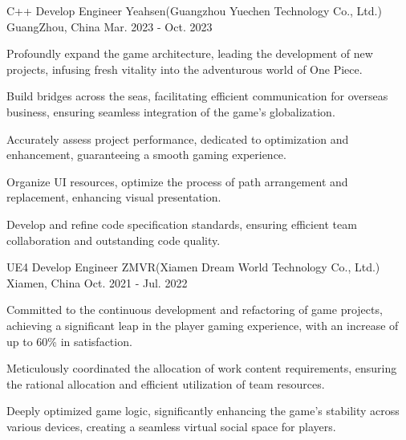

\begin{cventries}

  \cventry
    {C++ Develop Engineer} %
    {Yeahsen(Guangzhou Yuechen Technology Co., Ltd.)} %
    {GuangZhou, China} %
    {Mar. 2023 - Oct. 2023} %
    {
      \begin{cvitems} %
        \item {Profoundly expand the game architecture, leading the development of new projects, infusing fresh vitality into the adventurous world of One Piece.} 
        \item {Build bridges across the seas, facilitating efficient communication for overseas business, ensuring seamless integration of the game’s globalization.} 
        \item {Accurately assess project performance, dedicated to optimization and enhancement, guaranteeing a smooth gaming experience.} 
        \item {Organize UI resources, optimize the process of path arrangement and replacement, enhancing visual presentation.} 
        \item {Develop and refine code specification standards, ensuring efficient team collaboration and outstanding code quality.} 
      \end{cvitems}
    }

  \cventry
    {UE4 Develop Engineer} %
    {ZMVR(Xiamen Dream World Technology Co., Ltd.)} %
    {Xiamen, China} %
    {Oct. 2021 - Jul. 2022} %
    {
      \begin{cvitems} %
        \item {Committed to the continuous development and refactoring of game projects, achieving a significant leap in the player gaming experience, with an increase of up to 60\% in satisfaction.} 
        \item {Meticulously coordinated the allocation of work content requirements, ensuring the rational allocation and efficient utilization of team resources.} 
        \item {Deeply optimized game logic, significantly enhancing the game’s stability across various devices, creating a seamless virtual social space for players.} 
      \end{cvitems}
    }

\end{cventries}
